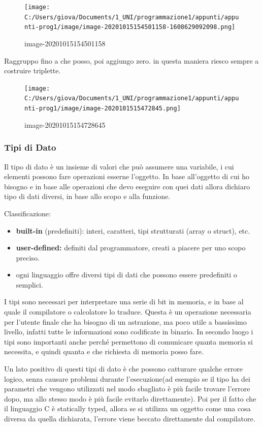 \documentclass[
  paper=a4,
  oneside  ,captions=tableheading
]{scrbook}
\providecommand{\tightlist}{%
  \setlength{\itemsep}{0pt}\setlength{\parskip}{0pt}}
\begin{document}
\begin{figure}
\centering
\texttt{[image: C:/Users/giova/Documents/1\_UNI/programmazione1/appunti/appunti-prog1/image/image-20201015154501158-1608629092098.png]}
\caption{image-20201015154501158}
\end{figure}

Raggruppo fino a che posso, poi aggiungo zero. in questa maniera riesco
sempre a costruire triplette.

\begin{figure}
\centering
\texttt{[image: C:/Users/giova/Documents/1\_UNI/programmazione1/appunti/appunti-prog1/image/image-2020101515472845.png]}
\caption{image-20201015154728645}
\end{figure}

\hypertarget{tipi-di-dato}{%
\subsubsection{Tipi di Dato}\label{tipi-di-dato}}

Il tipo di dato è un insieme di valori che può assumere una variabile, i
cui elementi possono fare operazioni esserne l'oggetto. In base
all'oggetto di cui ho bisogno e in base alle operazioni che devo
eseguire con quei dati allora dichiaro tipo di dati diversi, in base
allo scopo e alla funzione.

Classificazione:

\begin{itemize}
\tightlist
\item
  \textbf{built-in} (predefiniti): interi, caratteri, tipi strutturati
  (array o struct), etc.
\item
  \textbf{user-defined: }definiti dal programmatore, creati a piacere
  per uno scopo preciso.
\item
  ogni linguaggio offre diversi tipi di dati che possono essere
  predefiniti o semplici.
\end{itemize}

I tipi sono necessari per interpretare una serie di bit in memoria, e in
base al quale il compilatore o calcolatore lo traduce. Questa è un
operazione necessaria per l'utente finale che ha bisogno di un
astrazione, ma poco utile a bassissimo livello, infatti tutte le
informazioni sono codificate in binario. In secondo luogo i tipi sono
importanti anche perché permettono di comunicare quanta memoria si
necessita, e quindi quanta e che richiesta di memoria posso fare.

Un lato positivo di questi tipi di dato è che possono catturare qualche
errore logico, senza causare problemi durante l'esecuzione(ad esempio se
il tipo ha dei parametri che vengono utilizzati nel modo sbagliato è più
facile trovare l'errore dopo, ma allo stesso modo è più facile evitarlo
direttamente). Poi per il fatto che il linguaggio C è statically typed,
allora se si utilizza un oggetto come una cosa diversa da quella
dichiarata, l'errore viene beccato direttamente dal compilatore.
\end{document}
